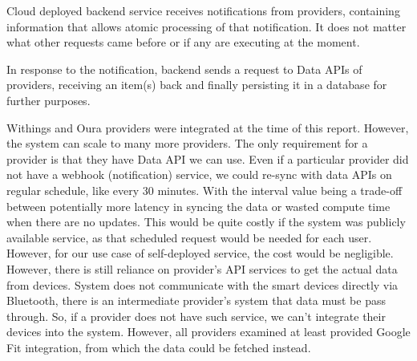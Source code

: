 Cloud deployed backend service receives notifications from providers, containing information that allows atomic processing of that notification. It does not matter what other requests came before or if any are executing at the moment. 

In response to the notification, backend sends a request to Data APIs of providers, receiving an item(s) back and finally persisting it in a database for further purposes. 

Withings and Oura providers were integrated at the time of this report. However, the system can scale to many more providers. The only requirement for a provider is that they have Data API we can use. Even if a particular provider did not have a webhook (notification) service, we could re-sync with data APIs on regular schedule, like every 30 minutes. With the interval value being a trade-off between potentially more latency in syncing the data or wasted compute time when there are no updates. This would be quite costly if the system was publicly available service, as that scheduled request would be needed for each user. However, for our use case of self-deployed service, the cost would be negligible. However, there is still reliance on provider's API services to get the actual data from devices. System does not communicate with the smart devices directly via Bluetooth, there is an intermediate provider's system that data must be pass through. So, if a provider does not have such service, we can't integrate their devices into the system. However, all providers examined at least provided Google Fit integration, from which the data could be fetched instead. 

